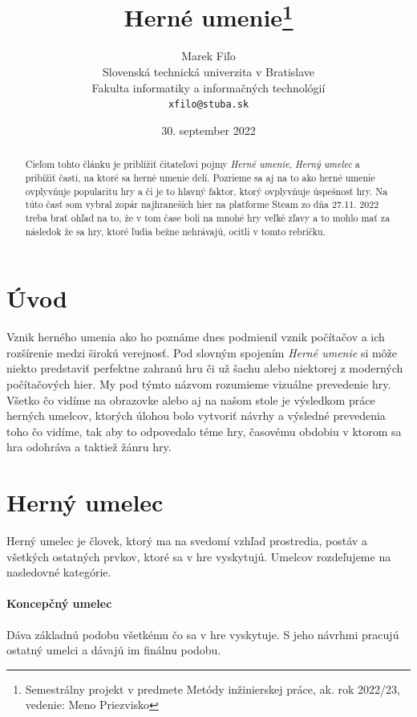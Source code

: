 \documentclass[10pt,twoside,slovak,a4paper]{article}
\title{Herné umenie\thanks{Semestrálny projekt v predmete Metódy inžinierskej práce, ak. rok 2022/23, vedenie: Meno Priezvisko}} %
\author{Marek Fiľo\\[2pt]
	{\small Slovenská technická univerzita v Bratislave}\\
	{\small Fakulta informatiky a informačných technológií}\\
	{\small \texttt{xfilo@stuba.sk}}
	}
\date{\small 30. september 2022} %
\begin{document}
\maketitle

\begin{abstract}


Cieľom tohto článku je priblížiť čitateľovi pojmy \emph{Herné umenie}, \emph{Herný umelec} a pribížiť časti, na ktoré sa herné umenie delí. Pozrieme sa aj na to ako herné umenie ovplyvňuje popularitu hry a či je to hlavný faktor, ktorý ovplyvňuje úspešnosť hry. Na túto časť som vybral zopár najhraneších hier na platforme Steam zo dňa 27.11. 2022 treba brať ohľad na to, že v tom čase boli na mnohé hry veľké zľavy a to mohlo mať za následok že sa hry, ktoré ľudia bežne nehrávajú, ocitli v tomto rebríčku.
\end{abstract}




\section{Úvod} \label{začiatok}
Vznik herného umenia ako ho poznáme dnes podmienil vznik počítačov a ich rozšírenie medzi širokú verejnosť.
Pod slovným spojením  \emph{Herné umenie} si môže niekto predstaviť perfektne zahranú hru či už šachu alebo niektorej z moderných počítačových hier. My pod týmto názvom rozumieme vizuálne prevedenie hry. Všetko čo vidíme na obrazovke alebo aj na našom stole je výsledkom práce herných umelcov, ktorých úlohou bolo vytvoriť návrhy a výsledné prevedenia toho čo vidíme, tak aby to odpovedalo téme hry, časovému obdobiu v ktorom sa hra odohráva a taktiež žánru hry.














\section{Herný umelec} \label{pokračovanie}
Herný umelec je človek, ktorý ma na svedomí vzhľad prostredia, postáv a všetkých ostatných prvkov, ktoré sa v hre vyskytujú. Umelcov rozdeľujeme na nasledovné kategórie.
\paragraph{Koncepčný umelec} Dáva základnú podobu všetkému čo sa v hre vyskytuje. S jeho návrhmi pracujú ostatný umelci a dávajú im finálnu podobu.
\cite{kon}
\end{document}
